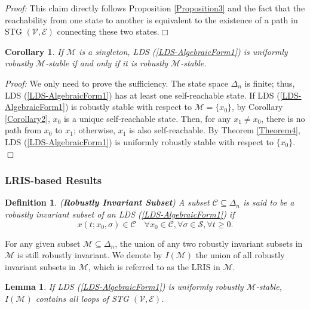 \documentclass[11pt,onecolumn]{article}
\newtheorem{corollary}{Corollary}
\newtheorem{lemma}{Lemma}
\newtheorem{definition}{Definition}
\begin{document}
{\it Proof:} This claim directly follows Proposition \ref{Proposition3} and the fact that the reachability from one state to another is equivalent to the existence of a path in STG $(\mathcal V,\mathcal E)$ connecting these two states.\hfill$\Box$

\begin{corollary}\label{Corollary1}
   If $\mathcal M$ is a singleton, LDS (\ref{LDS-AlgebraicForm1}) is uniformly robustly $\mathcal M$-stable if and only if it is robustly $\mathcal M$-stable.


\end{corollary}

{\it Proof:} We only need to prove the sufficiency. The state space $\Delta_n$ is finite; thus, LDS (\ref{LDS-AlgebraicForm1}) has at least one self-reachable state. If LDS (\ref{LDS-AlgebraicForm1}) is robustly stable with respect to $\mathcal M=\{  x_0\}$, by Corollary \ref{Corollary2}, $  x_0$ is a unique self-reachable state. Then, for any $  x_1\neq  x_0$, there is no path from $  x_0$ to $  x_1$; otherwise, $  x_1$ is also self-reachable. By Theorem \ref{Theorem4}, LDS (\ref{LDS-AlgebraicForm1}) is uniformly robustly stable with respect to $\{  x_0\}$.\hfill$\Box$




\subsubsection{LRIS-based Results}

\begin{definition}({\bf Robustly Invariant Subset})
  A subset $\mathcal{C}\subseteq\Delta_n$ is said to be a robustly invariant subset of an LDS (\ref{LDS-AlgebraicForm1}) if
      \[ x(t; x_0,\sigma)\in\mathcal{C}\quad \forall  x_0\in\mathcal{C}, \forall \sigma\in\mathcal S, \forall t\geq0.\]
 \end{definition}

For any given subset $\mathcal M\subseteq \Delta_n$, the union of any two robustly invariant subsets in $\mathcal{M}$ is still robustly invariant. We denote by $I(\mathcal{M})$ the union of all robustly invariant subsets in $\mathcal{M}$, which is referred to as the LRIS in $\mathcal M$.


\begin{lemma}\label{lemma1}
    If LDS (\ref{LDS-AlgebraicForm1}) is uniformly robustly $\mathcal M$-stable, $I(\mathcal M)$ contains all loops of STG $(\mathcal V,\mathcal E)$.
\end{lemma}
\end{document}
